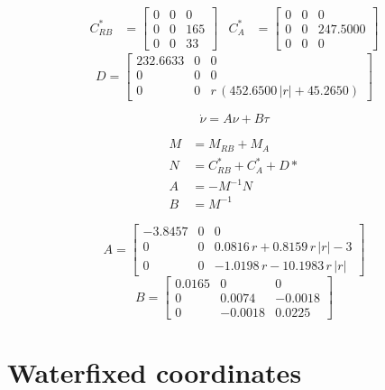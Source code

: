 \documentclass[12pt,a4]{article}
\begin{document}
\begin{align}
	C^*_{RB} & = \left[\begin{array}{ccc} 0 & 0 & 0\\ 0 & 0 & 165\\ 0 & 0 & 33 \end{array}\right]
	         &
	C^*_{A}  & = \left[\begin{array}{ccc} 0 & 0 & 0\\ 0 & 0 & 247.5000\\ 0 & 0 & 0 \end{array}\right]
\end{align}
\begin{equation}
	D = \left[\begin{array}{ccc} 232.6633 & 0 & 0\\ 0 & 0 & 0\\ 0 & 0 & r\,\left(452.6500\,\left|r\right|+45.2650\right) \end{array}\right]
\end{equation}

\begin{equation}
	\dot{\nu} = A \nu + B \tau
\end{equation}

\begin{align}
	M & = M_{RB} + M_A            \\
	N & = C^*_{RB} + C^*_{A} + D* \\
	A & = -M^{-1}N                \\
	B & = M^{-1}
\end{align}

\begin{equation}
	A = \left[\begin{array}{ccc} -3.8457 & 0 & 0\\ 0 & 0 & 0.0816\,r+0.8159\,r\,\left|r\right|-3\\ 0 & 0 & -1.0198\,r-10.1983\,r\,\left|r\right| \end{array}\right]
\end{equation}
\begin{equation}
	B = \left[\begin{array}{ccc} 0.0165 & 0 & 0\\ 0 & 0.0074 & -0.0018\\ 0 & -0.0018 & 0.0225 \end{array}\right]
\end{equation}

\section{Waterfixed coordinates}
\end{document}
